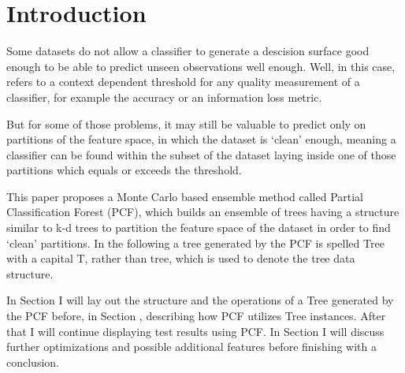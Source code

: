 \section{Introduction}

Some datasets do not allow a classifier to generate a
descision surface good enough to be able to predict unseen
observations well enough. Well, in this case, refers to a
context dependent threshold for any quality measurement of
a classifier, for example the accuracy or an information
loss metric.

But for some of those problems, it may still be valuable
to predict only on partitions of the feature space, in
which the dataset is `clean' enough, meaning a classifier
can be found within the subset of the dataset laying inside
one of those partitions which equals or exceeds the
threshold.

This paper proposes a Monte Carlo based ensemble method
called Partial Classification Forest (PCF), which builds an
ensemble of trees having a structure similar to
k-d trees to partition the feature space of the dataset in
order to find `clean' partitions. In the following a
tree generated by the PCF is spelled Tree with a capital
T, rather than tree, which is used to denote the tree data
structure.

In Section \MakeUppercase{} I will lay out
the structure and the operations of a Tree generated by the
PCF before, in Section \MakeUppercase{},
describing how PCF utilizes Tree instances. After that I
will continue displaying test results using PCF\@. In
Section \MakeUppercase{} I will discuss
further optimizations and possible additional features
before finishing with a conclusion.
